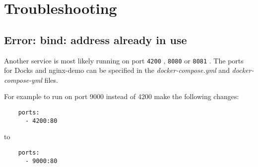 \documentclass[]{article}
\let\oldtexttt\texttt
\renewcommand{\texttt}[1]{
	\colorbox{Light}{\oldtexttt{#1}}
}
\begin{document}
\section{Troubleshooting}
\subsection{Error: bind: address already in use}
Another service is most likely running on port \texttt{4200}, \texttt{8080} or \texttt{8081}.
The ports for Docks and nginx-demo can be specified in the \emph{docker-compose.yml} 
and \emph{docker-compose-yml} files.

For example to run on port 9000 instead of 4200 make the following changes:

\begin{lstlisting}
    ports:
      - 4200:80
\end{lstlisting}
to
\begin{lstlisting}
    ports:
      - 9000:80
\end{lstlisting}
\end{document}
